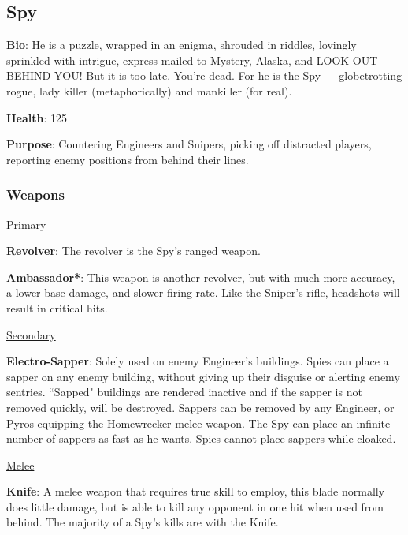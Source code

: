 \subsection{Spy}
\label{Spy}
{\bf Bio}:
He is a puzzle, wrapped in an enigma, shrouded in riddles, lovingly sprinkled with intrigue, express mailed to Mystery, Alaska, and LOOK OUT BEHIND YOU! But it is too late. You're dead. For he is the Spy — globetrotting rogue, lady killer (metaphorically) and mankiller (for real).

{\bf Health}: 125

{\bf Purpose}:
Countering Engineers and Snipers, picking off distracted players, reporting enemy positions from behind their lines.


\subsubsection {Weapons}

\begin {center}
\underline {Primary}
\end {center}

{\bf Revolver}: The revolver is the Spy's ranged weapon.

{\bf Ambassador*}: This weapon is another revolver, but with much more accuracy, a lower base damage, and slower firing rate.  Like the Sniper's rifle, headshots will result in critical hits.

\begin {center}
\underline {Secondary}
\end {center}
\label{sapper}
{\bf Electro-Sapper}: Solely used on enemy Engineer's buildings. Spies can place a sapper on any enemy building, without giving up their disguise or alerting enemy sentries. ``Sapped" buildings are rendered inactive and if the sapper is not removed quickly, will be destroyed. Sappers can be removed by any Engineer, or Pyros equipping the Homewrecker melee weapon. The Spy can place an infinite number of sappers as fast as he wants. Spies cannot place sappers while cloaked.

\begin {center}
\underline {Melee}
\end {center}

{\bf Knife}: A melee weapon that requires true skill to employ, this blade normally does little damage, but is able to kill any opponent in one hit when used from behind. The majority of a Spy's kills are with the Knife.

\newpage

